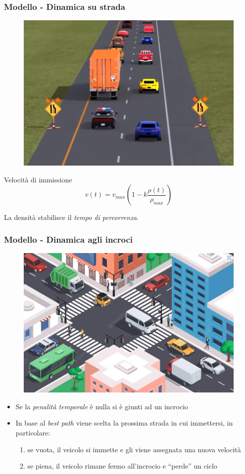 \documentclass[
	11pt, %
]{beamer}
\begin{document}
\begin{frame}
	\frametitle{Modello - Dinamica su strada}
	\begin{figure}
		\includegraphics[width=.33\textwidth]{cars.jpg}
	\end{figure}
	\begin{block}{Velocit\`a di immissione}
		\begin{equation*}
			v(t) = v_{max}\left(1-k\frac{\rho(t)}{\rho_{max}}\right)
		\end{equation*}
	\end{block}
	\vspace{10mm}
	La densit\`a stabilisce il \emph{tempo di percorrenza}.	
\end{frame}

\begin{frame}
	\frametitle{Modello - Dinamica agli incroci}
	\begin{figure}
		\includegraphics[width=.4\textwidth]{intersection.png}
	\end{figure}
	\begin{itemize}
		\item Se la \emph{penalit\`a temporale} \`e nulla si \`e giunti ad un incrocio
		\item In base al \emph{best path} viene scelta la prossima strada in cui immettersi, in particolare:
			\begin{enumerate}
				\item se vuota, il veicolo si immette e gli viene assegnata una nuova velocit\`a
				\item se piena, il veicolo rimane fermo all'incrocio e ``perde'' un ciclo
			\end{enumerate}
	\end{itemize}
	
\end{frame}
\end{document}
